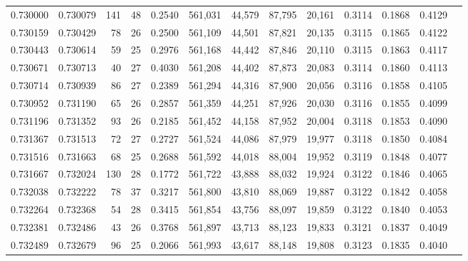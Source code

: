 \begin{tabular}{rrrrrrrrrrrrr}
0.730000 & 0.730079 &    141 &    48 &                                     0.2540 & 561,031 &  44,579 &  87,795 &  20,161 & 0.3114 & 0.1868 & 0.4129 \\
0.730159 & 0.730429 &     78 &    26 &                                     0.2500 & 561,109 &  44,501 &  87,821 &  20,135 & 0.3115 & 0.1865 & 0.4122 \\
0.730443 & 0.730614 &     59 &    25 &                                     0.2976 & 561,168 &  44,442 &  87,846 &  20,110 & 0.3115 & 0.1863 & 0.4117 \\
0.730671 & 0.730713 &     40 &    27 &                                     0.4030 & 561,208 &  44,402 &  87,873 &  20,083 & 0.3114 & 0.1860 & 0.4113 \\
0.730714 & 0.730939 &     86 &    27 &                                     0.2389 & 561,294 &  44,316 &  87,900 &  20,056 & 0.3116 & 0.1858 & 0.4105 \\
0.730952 & 0.731190 &     65 &    26 &                                     0.2857 & 561,359 &  44,251 &  87,926 &  20,030 & 0.3116 & 0.1855 & 0.4099 \\
0.731196 & 0.731352 &     93 &    26 &                                     0.2185 & 561,452 &  44,158 &  87,952 &  20,004 & 0.3118 & 0.1853 & 0.4090 \\
0.731367 & 0.731513 &     72 &    27 &                                     0.2727 & 561,524 &  44,086 &  87,979 &  19,977 & 0.3118 & 0.1850 & 0.4084 \\
0.731516 & 0.731663 &     68 &    25 &                                     0.2688 & 561,592 &  44,018 &  88,004 &  19,952 & 0.3119 & 0.1848 & 0.4077 \\
0.731667 & 0.732024 &    130 &    28 &                                     0.1772 & 561,722 &  43,888 &  88,032 &  19,924 & 0.3122 & 0.1846 & 0.4065 \\
0.732038 & 0.732222 &     78 &    37 &                                     0.3217 & 561,800 &  43,810 &  88,069 &  19,887 & 0.3122 & 0.1842 & 0.4058 \\
0.732264 & 0.732368 &     54 &    28 &                                     0.3415 & 561,854 &  43,756 &  88,097 &  19,859 & 0.3122 & 0.1840 & 0.4053 \\
0.732381 & 0.732486 &     43 &    26 &                                     0.3768 & 561,897 &  43,713 &  88,123 &  19,833 & 0.3121 & 0.1837 & 0.4049 \\
0.732489 & 0.732679 &     96 &    25 &                                     0.2066 & 561,993 &  43,617 &  88,148 &  19,808 & 0.3123 & 0.1835 & 0.4040 \\

\end{tabular}
